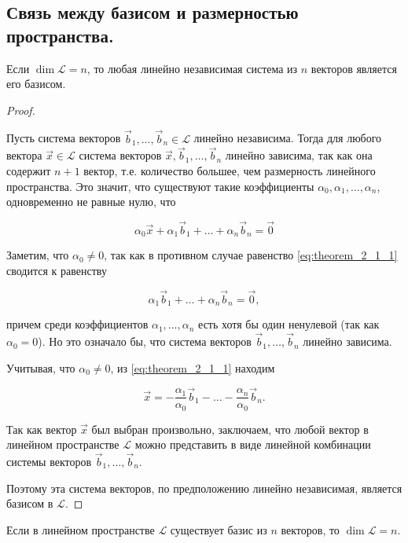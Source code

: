 \subsection{
    Связь между базисом и размерностью пространства.
}

\begin{theorem}
    Если $\dim \mathcal{L} = n$, то любая линейно независимая система из $n$ векторов является его базисом.
    \label{thm:theorem_2_1}
\end{theorem}

\begin{proof}~

    Пусть система векторов $\vec{b}_1, \ldots, \vec{b}_n \in \mathcal{L}$ линейно независима. Тогда для любого вектора $\vec{x} \in \mathcal{L}$ система векторов $\vec{x}, \vec{b}_1, \ldots, \vec{b}_n$ линейно зависима, так как она содержит $n + 1$ вектор, т.е. количество большее, чем размерность линейного пространства. Это значит, что существуют такие коэффициенты $\alpha_0, \alpha_1, \ldots, \alpha_n$, одновременно не равные нулю, что

    \begin{equation}
        \alpha_0\vec{x} + \alpha_1\vec{b}_1 + \ldots + \alpha_n\vec{b}_n = \vec{0}
        \label{eq:theorem_2_1_1}
    \end{equation}

    Заметим, что $\alpha_0 \ne 0$, так как в противном случае равенство \eqref{eq:theorem_2_1_1} сводится к равенству

    \begin{equation}
        \alpha_1\vec{b}_1 + \ldots + \alpha_n\vec{b}_n = \vec{0},
    \end{equation}

    причем среди коэффициентов $\alpha_1, \ldots, \alpha_n$ есть хотя бы один ненулевой (так как $\alpha_0 = 0$). Но это означало бы, что система векторов $\vec{b}_1, \ldots, \vec{b}_n$ линейно зависима. 
    
    Учитывая, что $\alpha_0 \ne 0$, из \eqref{eq:theorem_2_1_1} находим

    \begin{equation}
        \vec{x} = -\frac{\alpha_1}{\alpha_0}\vec{b}_1 - \ldots - \frac{\alpha_n}{\alpha_0}\vec{b}_n.
    \end{equation}

    Так как вектор $\vec{x}$ был выбран произвольно, заключаем, что любой вектор в линейном пространстве $\mathcal{L}$ можно представить в виде линейной комбинации системы векторов $\vec{b}_1, \ldots, \vec{b}_n$.

    Поэтому эта система векторов, по предположению линейно независимая, является базисом в $\mathcal{L}$.
\end{proof}

\begin{theorem}[обратная]
    Если в линейном пространстве $\mathcal{L}$ существует базис из $n$ векторов, то $\dim \mathcal{L} = n$.
    \label{thm:theorem_2_2}
\end{theorem}